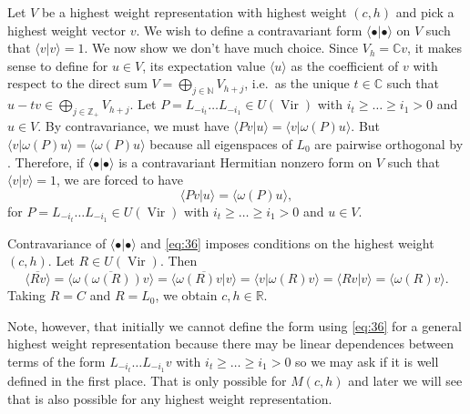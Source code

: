 \documentclass[a4paper, 12pt, reqno]{amsart}
\theoremstyle{remark}
\numberwithin{equation}{subsection}
\DeclareMathOperator{\Vir}{Vir}
\begin{document}
Let $V$ be a highest weight representation with highest weight $(c, h)$ and pick a highest weight vector $v$.
We wish to define a contravariant form $\langle \bullet| \bullet\rangle$ on $V$ such that $\langle v| v\rangle = 1$.
We now show we don't have much choice.
Since $V_h = \mathbb{C}v$, it makes sense to define for $u \in V$, its expectation value $\langle u\rangle$ as the coefficient of $v$ with respect to the direct sum $V = \bigoplus_{j \in \mathbb{N}}V_{h + j}$, i.e.\ as the unique $t \in \mathbb{C}$ such that $u - tv \in \bigoplus_{j \in \mathbb{Z}_+}V_{h + j}$.
Let $P = L_{-i_t}\dots L_{-i_1} \in U(\Vir)$ with $i_t \ge \dots \ge i_1 > 0$ and $u \in V$.
By contravariance, we must have $\langle Pv| u\rangle = \langle v| \omega(P)u\rangle$.
But $\langle v| \omega(P)u\rangle = \langle \omega(P)u\rangle$ because all eigenspaces of $L_0$ are pairwise orthogonal by .
Therefore, if $\langle \bullet| \bullet\rangle$ is a contravariant Hermitian nonzero form on $V$ such that $\langle v| v\rangle = 1$, we are forced to have
\begin{equation}
  \label{eq:36}
  \langle Pv| u\rangle = \langle \omega(P)u\rangle,
\end{equation}
for $P = L_{-i_t} \dots L_{-i_1} \in U(\Vir)$ with $i_t \ge \dots \ge i_1 > 0$ and $u \in V$.

Contravariance of $\langle \bullet| \bullet\rangle$ and \eqref{eq:36} imposes conditions on the highest weight $(c, h)$.
Let $R \in U(\Vir)$.
Then
\begin{equation*}
  \overline{\langle Rv\rangle} = \overline{\langle \omega(\omega(R))v\rangle} = \overline{\langle \omega(R)v| v\rangle} = \langle v| \omega(R)v\rangle = \langle Rv| v\rangle = \langle \omega(R)v\rangle.
\end{equation*}
Taking $R = C$ and $R = L_0$, we obtain $c, h \in \mathbb{R}$.

Note, however, that initially we cannot define the form using \eqref{eq:36} for a general highest weight representation because there may be linear dependences between terms of the form $L_{-i_t}\dots L_{-i_1}v$ with $i_t \ge \dots \ge i_1 > 0$ so we may ask if it is well defined in the first place.
That is only possible for $M(c, h)$ and later we will see that is also possible for any highest weight representation.
\end{document}
